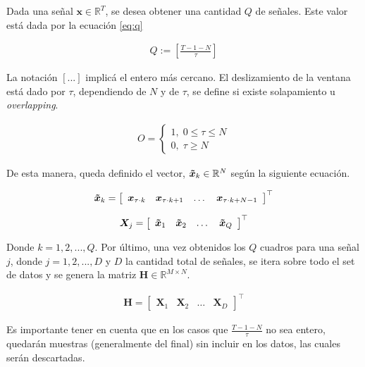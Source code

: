 \indent Dada una señal $\mathbf{x} \in \mathbb{R}^T$, se desea obtener una cantidad $Q$ de señales. Este valor está
dada por la ecuación \ref{eq:q}

\begin{align}
  \label{eq:q}
  Q := \left[\frac{T-1-N}{\tau}\right]
\end{align}

\indent La notación $[...]$ implicá el entero más cercano. El deslizamiento de la ventana está dado por $\tau$,
dependiendo de $N$ y de $\tau$, se define si existe solapamiento u \textit{overlapping}.

\begin{align}
  O =
  \begin{cases}
    1, \; 0 \leq \tau \leq N \\
    0, \; \tau \geq N
  \end{cases}
\end{align}

\indent De esta manera, queda definido el vector, $\bm{\Tilde{x}}_k \in \mathbb{R}^{N}$ según la siguiente ecuación.

\begin{align}
  \bm{\Tilde{x}}_k = \left[\begin{array}{cccc}
    \bm{x}_{\tau \cdot k} &
    \bm{x}_{\tau \cdot k+1} &
    \dots & \bm{x}_{\tau \cdot k + N - 1}
  \end{array}\right]^\top
\end{align}

\begin{align}
  \bm{X}_j = \left[\begin{array}{cccc}
    \bm{\Tilde{x}}_1 &
    \bm{\Tilde{x}}_2 &
    \dots &
    \bm{\Tilde{x}}_Q
  \end{array}\right]^\top
\end{align}

\indent Donde $k = 1,2,...,Q$. Por último, una vez obtenidos los $Q$ cuadros para una señal $j$, donde $j = 1,2,...,
D$ y $D$ la cantidad total de señales, se itera sobre todo el set de datos y se genera la matriz $\bm{H} \in
\mathbb{R}^{M \times N}$.

\begin{align}
  \bm{H} = \left[\begin{array}{cccc}
    \bm{X}_1 &
    \bm{X}_2 &
    \dots &
    \bm{X}_D
  \end{array}\right]^\top
\end{align}

\indent Es importante tener en cuenta que en los casos que $\frac{T-1-N}{\tau}$ no sea entero, quedarán muestras
(generalmente del final) sin incluir en los datos, las cuales serán descartadas.

